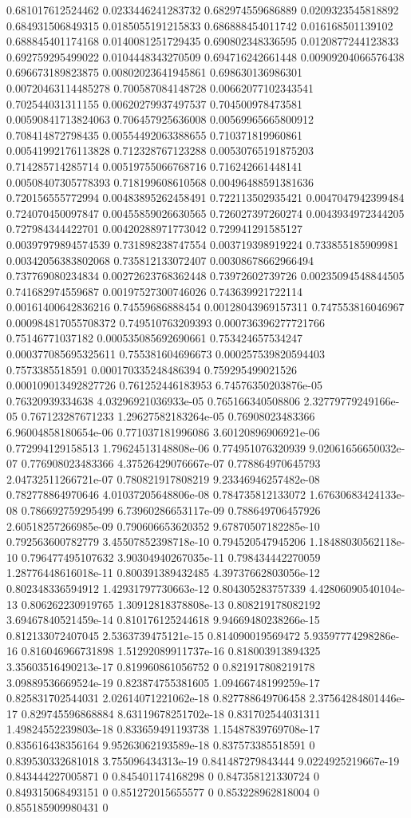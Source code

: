 \begin{table}
\begin{tabu}
\begin{sparkline}{10}
0.681017612524462 0.0233446241283732 0.682974559686889 0.0209323545818892 0.684931506849315 0.0185055191215833 0.686888454011742 0.016168501139102 0.688845401174168 0.0140081251729435 0.690802348336595 0.0120877244123833 0.692759295499022 0.0104448343270509 0.694716242661448 0.00909204066576438 0.696673189823875 0.00802023641945861 0.698630136986301 0.00720463114485278 0.700587084148728 0.00662077102343541 0.702544031311155 0.00620279937497537 0.704500978473581 0.00590841713824063 0.706457925636008 0.00569965665800912 0.708414872798435 0.00554492063388655 0.710371819960861 0.00541992176113828 0.712328767123288 0.00530765191875203 0.714285714285714 0.00519755066768716 0.716242661448141 0.00508407305778393 0.718199608610568 0.00496488591381636 0.720156555772994 0.00483895262458491 0.722113502935421 0.0047047942399484 0.724070450097847 0.00455859026630565 0.726027397260274 0.0043934972344205 0.727984344422701 0.00420288971773042 0.729941291585127 0.00397979894574539 0.731898238747554 0.003719398919224 0.733855185909981 0.00342056383802068 0.735812133072407 0.00308678662966494 0.737769080234834 0.00272623768362448 0.73972602739726 0.00235094548844505 0.741682974559687 0.00197527300746026 0.743639921722114 0.00161400642836216 0.74559686888454 0.00128043969157311 0.747553816046967 0.000984817055708372 0.749510763209393 0.000736396277721766 0.75146771037182 0.000535085692690661 0.753424657534247 0.000377085695325611 0.755381604696673 0.000257539820594403 0.7573385518591 0.000170335248486394 0.759295499021526 0.000109013492827726 0.761252446183953 6.74576350203876e-05 0.76320939334638 4.03296921036933e-05 0.765166340508806 2.32779779249166e-05 0.767123287671233 1.29627582183264e-05 0.76908023483366 6.96004858180654e-06 0.771037181996086 3.60120896906921e-06 0.772994129158513 1.79624513148808e-06 0.774951076320939 9.02061656650032e-07 0.776908023483366 4.37526429076667e-07 0.778864970645793 2.04732511266721e-07 0.780821917808219 9.23346946257482e-08 0.782778864970646 4.01037205648806e-08 0.784735812133072 1.67630683424133e-08 0.786692759295499 6.73960286653117e-09 0.788649706457926 2.60518257266985e-09 0.790606653620352 9.67870507182285e-10 0.792563600782779 3.45507852398718e-10 0.794520547945206 1.18488030562118e-10 0.796477495107632 3.90304940267035e-11 0.798434442270059 1.28776448616018e-11 0.800391389432485 4.39737662803056e-12 0.802348336594912 1.42931797730663e-12 0.804305283757339 4.42806090540104e-13 0.806262230919765 1.30912818378808e-13 0.808219178082192 3.69467840521459e-14 0.810176125244618 9.94669480238266e-15 0.812133072407045 2.5363739475121e-15 0.814090019569472 5.93597774298286e-16 0.816046966731898 1.51292089911737e-16 0.818003913894325 3.35603516490213e-17 0.819960861056752 0 0.821917808219178 3.09889536669524e-19 0.823874755381605 1.09466748199259e-17 0.825831702544031 2.02614071221062e-18 0.827788649706458 2.37564284801446e-17 0.829745596868884 8.63119678251702e-18 0.831702544031311 1.49824552239803e-18 0.833659491193738 1.15487839769708e-17 0.835616438356164 9.95263062193589e-18 0.837573385518591 0 0.839530332681018 3.755096434313e-19 0.841487279843444 9.0224925219667e-19 0.843444227005871 0 0.845401174168298 0 0.847358121330724 0 0.849315068493151 0 0.851272015655577 0 0.853228962818004 0 0.855185909980431 0 
\end{sparkline}
\end{tabu}
\end{table}
